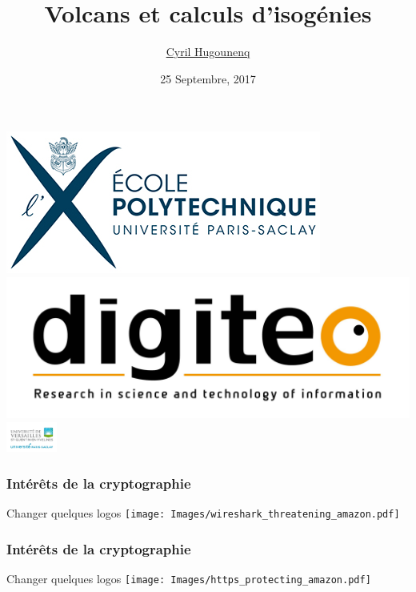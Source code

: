 \documentclass[10pt,a4paper]{beamer}
\theoremstyle{plain}
\theoremstyle{definition}
\theoremstyle{definition}
\theoremstyle{definition}
\theoremstyle{definition}
\theoremstyle{remark}
\theoremstyle{remark}
\theoremstyle{definition}
\begin{document}
\author{
\href{http://www.prism.uvsq.fr/~huc/}{Cyril Hugounenq}
}
\title[Volcans et calculs d'isogénies]{
Volcans et calculs d'isogénies}
\date{25 Septembre, 2017}


\begin{frame}
\titlepage

\hfill
\includegraphics[scale=0.6]{Images/Logo_Ecole_polytechnique_horizontal_300dpi.jpg} \hfill
\includegraphics[scale=0.1]{Images/digiteo.jpg}\hfill
\includegraphics[height=10mm]{Images/uvsq-logo-cmjn.jpg}
\end{frame}

\begin{frame}
\frametitle{Intérêts de la cryptographie}
Changer quelques logos
\texttt{[image: Images/wireshark\_threatening\_amazon.pdf]} 
\end{frame}

\begin{frame}
\frametitle{Intérêts de la cryptographie}
Changer quelques logos
\texttt{[image: Images/https\_protecting\_amazon.pdf]} 
\end{frame}
\end{document}
